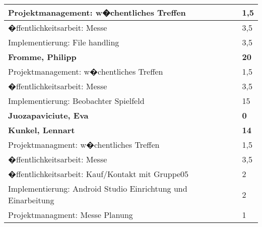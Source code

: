 \documentclass[a4paper,11pt]{scrartcl}
\begin{document}
\begin{longtable}{| p{13.8cm} | C{2.4cm} |}
  Projektmanagement: w�chentliches Treffen
	&
  1,5
	\\
	\hline

  �ffentlichkeitsarbeit: Messe
	&
  3,5
	\\
	\hline

  Implementierung: File handling
	&
  3,5
	\\
	\hline
	\hline


	\textbf{Fromme, Philipp} & \textbf{20}\\ %
	\hline

	Projektmanagement: w�chentliches Treffen
	&
	1,5
	\\
	\hline

	�ffentlichkeitsarbeit: Messe
	&
	3,5
	\\
	\hline

  Implementierung: Beobachter Spielfeld
	&
  15
	\\
	\hline
	\hline


	\textbf{Juozapaviciute, Eva} & \textbf{0}\\ %
	\hline


	\hline
	\hline


	\textbf{Kunkel, Lennart} & \textbf{14}\\ %
	\hline

  Projektmanagment: w�chentliches Treffen
	&
  1,5
	\\
	\hline

  �ffentlichkeitsarbeit: Messe
	&
  3,5
	\\
	\hline

  �ffentlichkeitsarbeit: Kauf/Kontakt mit Gruppe05
	&
  2
	\\
	\hline

  Implementierung: Android Studio Einrichtung und Einarbeitung
	&
  2
	\\
	\hline

  Projektmanagment: Messe Planung
	&
  1
	\\
	\hline


\end{longtable}
\end{document}
